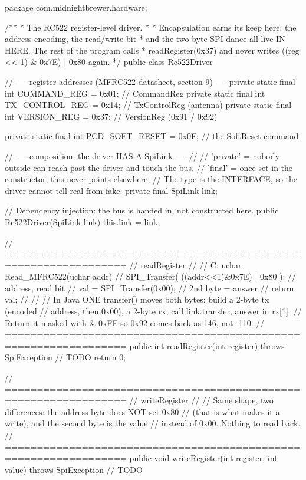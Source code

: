 \begin{jcode}
package com.midnightbrewer.hardware;

/**
 * The RC522 register-level driver.
 *
 * Encapsulation earns its keep here: the address encoding, the read/write bit
 * and the two-byte SPI dance all live IN HERE. The rest of the program calls
 * readRegister(0x37) and never writes ((reg << 1) & 0x7E) | 0x80 again.
 */
public class Rc522Driver {

    // ---- register addresses (MFRC522 datasheet, section 9) ----
    private static final int COMMAND_REG    = 0x01;  // CommandReg
    private static final int TX_CONTROL_REG = 0x14;  // TxControlReg (antenna)
    private static final int VERSION_REG    = 0x37;  // VersionReg (0x91 / 0x92)

    private static final int PCD_SOFT_RESET = 0x0F;  // the SoftReset command

    // ---- composition: the driver HAS-A SpiLink ----
    //
    // 'private' = nobody outside can reach past the driver and touch the bus.
    // 'final'   = once set in the constructor, this never points elsewhere.
    // The type is the INTERFACE, so the driver cannot tell real from fake.
    private final SpiLink link;

    // Dependency injection: the bus is handed in, not constructed here.
    public Rc522Driver(SpiLink link) {
        this.link = link;
    }

    // =================================================================
    // readRegister
    //
    //   C:  uchar Read_MFRC522(uchar addr) {
    //           SPI_Transfer( ((addr<<1)&0x7E) | 0x80 );  // address, read bit
    //           val = SPI_Transfer(0x00);                 // 2nd byte = answer
    //           return val;
    //       }
    //
    //   In Java ONE transfer() moves both bytes: build a 2-byte tx (encoded
    //   address, then 0x00), a 2-byte rx, call link.transfer, answer in rx[1].
    //   Return it masked with & 0xFF so 0x92 comes back as 146, not -110.
    // =================================================================
    public int readRegister(int register) throws SpiException {
        // TODO
        return 0;
    }

    // =================================================================
    // writeRegister
    //
    //   Same shape, two differences: the address byte does NOT set 0x80
    //   (that is what makes it a write), and the second byte is the value
    //   instead of 0x00. Nothing to read back.
    // =================================================================
    public void writeRegister(int register, int value) throws SpiException {
        // TODO
    }

}
\end{jcode}
